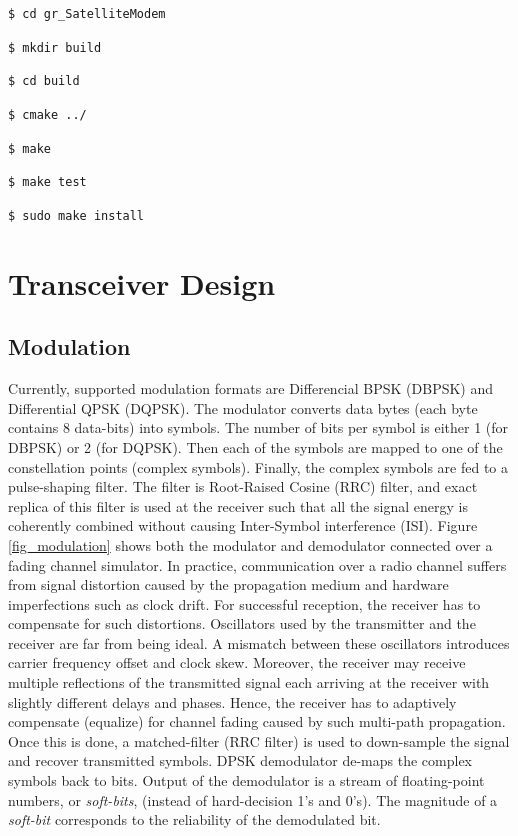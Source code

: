 \documentclass[peerreview,onecolumn]{IEEEtran}
\begin{document}
\begin{description}
\item \texttt{\$ cd gr\_SatelliteModem}
\item \texttt{\$ mkdir build}
\item \texttt{\$ cd build }
\item \texttt{\$ cmake ../ }
\item \texttt{\$ make}
\item \texttt{\$ make test}
\item \texttt{\$ sudo make install}
\end{description}

\section{Transceiver Design}

\subsection{Modulation}
Currently, supported modulation formats are Differencial BPSK (DBPSK) and Differential QPSK (DQPSK). The modulator converts data bytes (each byte contains 8 data-bits) into symbols. The number of bits per symbol is either 1 (for DBPSK) or 2 (for DQPSK). Then each of the symbols are mapped to one of the constellation points (complex symbols). Finally, the complex symbols are fed to a pulse-shaping filter. The filter is Root-Raised Cosine (RRC) filter, and exact replica of this filter is used at the receiver such that all the signal energy is coherently combined without causing Inter-Symbol interference (ISI). Figure \ref{fig_modulation} shows both the modulator and demodulator connected over a fading channel simulator. In practice, communication over a radio channel suffers from signal distortion caused by the propagation medium and hardware imperfections such as clock drift. For successful reception, the receiver has to compensate for such distortions. Oscillators used by the transmitter and the receiver are far from being ideal. A mismatch between these oscillators introduces carrier frequency offset and clock skew. Moreover, the receiver may receive multiple reflections of the transmitted signal each arriving at the receiver with slightly different delays and phases. Hence, the receiver has to adaptively compensate (equalize) for channel fading caused by such multi-path propagation. Once this is done, a matched-filter (RRC filter) is used to down-sample the signal and recover transmitted symbols. DPSK demodulator de-maps the complex symbols back to bits. Output of the demodulator is a stream of floating-point numbers, or \emph{soft-bits}, (instead of hard-decision 1's and 0's). The magnitude of a \emph{soft-bit} corresponds to the reliability of the demodulated bit. 
\end{document}
